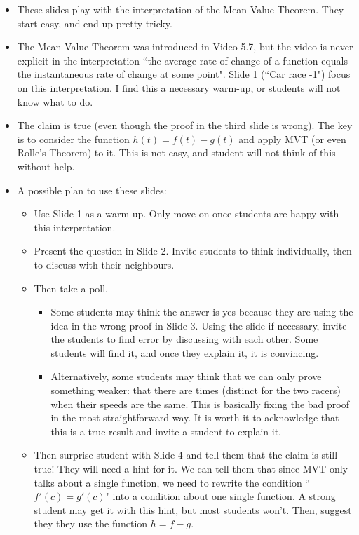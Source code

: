 \documentclass[11pt]{article}
\newcommand {\DS} [1] {${\displaystyle #1}$}
\newcommand{\nl}{\hfill \vspace{-1.1\baselineskip}} %
\begin{document}
\begin{comments}
\nl
\begin{itemize}
\item These slides play with the interpretation of the Mean Value Theorem.  They start easy, and end up pretty tricky.

\item   The Mean Value Theorem was introduced in Video 5.7, but the video is never explicit in the interpretation ``the average rate of change of a function equals the instantaneous rate of change at some point".   Slide 1 (``Car race -1") focus on this interpretation.    I find this a necessary warm-up, or students will not know what to do.

\item The claim is true (even though the proof in the third slide is wrong).  The key is to consider the function \DS{h(t) = f(t) - g(t)} and apply MVT (or even Rolle's Theorem) to it.  This is not easy, and student will not think of this without help.

\item A possible plan to use these slides:
	\begin{itemize}
		\item  Use Slide 1 as a warm up.  Only move on once students are happy with this interpretation.
		\item Present the question in Slide 2.  Invite students to think individually, then to discuss with their neighbours.
		\item Then take a poll.  
			\begin{itemize}
				\item Some students may think the answer is yes because they are  using the idea in the wrong proof in Slide 3.   Using the slide if necessary, invite the students to find error by discussing with each other.  Some students will find it, and once they explain it, it is convincing.
				\item  Alternatively, some students may think that we can only prove something weaker: that there are times (distinct for the two racers) when their speeds are the same.  This is basically fixing the bad proof in the most straightforward way.  It is worth it to acknowledge that this is a true result and invite a student to explain it.
			\end{itemize}
		\item Then surprise student with Slide 4 and tell them that the claim is still true!    They will need a hint for it.  We can tell them that since MVT only talks about a single function, we need to rewrite the condition ``$f'(c)=g'(c)$" into a condition about one single function.  A strong student may get it with this hint, but most students won't.  Then, suggest they they use the function $h=f-g$.
	\end{itemize}

\end{itemize}	
\end{comments}
\end{document}
